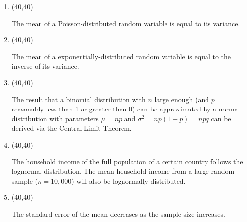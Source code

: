 \documentclass[11pt,twoside]{article}
\numberwithin{equation}{section}
\newcommand{\?}{\stackrel{?}{=}}
\newcommand{\gr}{\color{green!40!black}}
\begin{document}
\begin{enumerate}[\bf (i)]
\item \hfill
  \begin{minipage}{.1\linewidth}
    \framebox(40,40){ \gr }
  \end{minipage}\quad
  \begin{minipage}{.85\linewidth}
    The mean of a Poisson-distributed random variable is equal to its variance.
   \end{minipage}
  
  \smallskip
  
\item \hfill
  \begin{minipage}{.1\linewidth}
    \framebox(40,40){\gr  }
  \end{minipage}\quad
  \begin{minipage}{.85\linewidth}
    The mean of a exponentially-distributed random variable is equal to the inverse of its variance.
   \end{minipage}

  \smallskip
  
\item \hfill
  \begin{minipage}{.1\linewidth}
    \framebox(40,40){\gr  }
  \end{minipage}\quad
  \begin{minipage}{.85\linewidth}
    The result that a binomial distribution with $n$ large enough (and $p$ reasonably less than 1 or greater than 0) can
    be approximated by a normal distribution with parameters $\mu = np$ and $\sigma^{2} = np(1-p) = npq$ can be derived
    via the Central Limit Theorem.  
  \end{minipage}

  \smallskip
  
\item \hfill
  \begin{minipage}{.1\linewidth}
    \framebox(40,40){\gr  }
  \end{minipage}\quad
  \begin{minipage}{.85\linewidth}
    The household income of the full population of a certain country follows the lognormal distribution. The mean
    household income from a large random sample ($n = 10,000$) will also be lognormally distributed.
   \end{minipage}

  \smallskip

\item \hfill
  \begin{minipage}{.1\linewidth}
    \framebox(40,40){\gr  }
  \end{minipage}\quad
  \begin{minipage}{.85\linewidth}
    The standard error of the mean decreases as the sample size increases.
   \end{minipage}

\end{enumerate}
\end{document}
